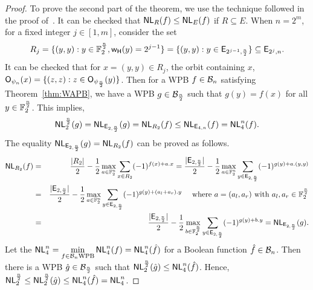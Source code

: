 \documentclass{llncs}
\begin{document}
\begin{proof}
To prove the second part of the theorem, we use the technique followed in the proof of~\cite[Theorem-3.14]{DCC:LiuMes19}.
It can be checked that $\mathsf{NL}_{R}(f) \leq \mathsf{NL}_{E}(f)$ if $R \subseteq E$.
When $n = 2^m$, for a fixed integer $j \in [1,m]$, consider the set  
$$R_j = \{(y,y) : y \in \mathbb{F}_2^{\frac{n}{2}}, \mathsf{w_H}(y)= 2^{j-1} \} = \{(y,y) : y \in \mathsf{E}_{2^{j-1},\frac{n}{2}} \} \subseteq \mathsf{E}_{2^j,n}.$$
It can be checked that for $x = (y,y) \in R_j$, the orbit containing $x$, $\mathsf{O}_{\psi_n}(x) = \{(z,z) : z \in \mathsf{O}_{\psi_\frac{n}{2}}(y)\}$.
Then for a WPB $f \in \mathcal{B}_n$ satisfying Theorem~\ref{thm:WAPB}, we have a WPB $g \in \mathcal{B}_{\frac{n}{2}}$  such that $g(y) = f(x)$ for all $y \in \mathbb{F}_2^{\frac{n}{2}}$. 
This implies, 
\begin{equation}\label{eqn:NL}
\mathsf{NL}_{2}^{\frac{n}{2}}(g) = \mathsf{NL}_{\mathsf{E}_{2,\frac{n}{2}}}(g) = \mathsf{NL}_{R_2}(f) \leq \mathsf{NL}_{\mathsf{E}_{4,n}}(f) = \mathsf{NL}_{4}^{n}(f).
\end{equation}
The equality $\mathsf{NL}_{\mathsf{E}_{2,\frac{n}{2}}}(g) = \mathsf{NL}_{R_2}(f)$ can be proved as follows.
\begin{eqnarray*}
\mathsf{NL}_{R_2}(f) & = & \frac{|R_2|}{2} - \frac{1}{2}\max\limits_{a \in \mathbb{F}_2^n}{\sum\limits_{x\in R_2} (-1)^{f(x)+a.x}} 
= \frac{|\mathsf{E}_{2,\frac{n}{2}}|}{2} - \frac{1}{2}\max\limits_{a \in \mathbb{F}_2^n}{\sum\limits_{y \in \mathsf{E}_{2,\frac{n}{2}}} (-1)^{g(y)+a.(y,y)}} \\
& = & \frac{|\mathsf{E}_{2,\frac{n}{2}}|}{2} - \frac{1}{2}\max\limits_{a \in \mathbb{F}_2^n}{\sum\limits_{y \in \mathsf{E}_{2,\frac{n}{2}}} (-1)^{g(y)+(a_l+a_r).y}} ~~~\text{ where } a = (a_l,a_r)\text{ with } a_l,a_r \in \mathbb{F}_2^{\frac{n}{2}}\\
& = & \frac{|\mathsf{E}_{2,\frac{n}{2}}|}{2} - \frac{1}{2}\max\limits_{b \in \mathbb{F}_2^{\frac{n}{2}}}{\sum\limits_{y \in \mathsf{E}_{2,\frac{n}{2}}} (-1)^{g(y)+b.y}} = \mathsf{NL}_{\mathsf{E}_{2,\frac{n}{2}}}(g).
\end{eqnarray*}
Let the $\mathsf{NL}_{4}^{n} = \min\limits_{f\in \mathcal{B}_n \text{WPB}} \mathsf{NL}_{4}^{n}(f) = \mathsf{NL}_{4}^{n}(\hat{f})$ for a Boolean function $\hat{f} \in \mathcal{B}_n$. Then there is a WPB $\hat{g} \in \mathcal{B}_{\frac{n}{2}}$ such that $\mathsf{NL}_{2}^{\frac{n}{2}}(\hat{g}) \leq \mathsf{NL}_{4}^{n}(\hat{f})$. Hence, $\mathsf{NL}_{2}^{\frac{n}{2}} \leq \mathsf{NL}_{2}^{\frac{n}{2}}(\hat{g}) \leq \mathsf{NL}_{4}^{n}(\hat{f}) = \mathsf{NL}_{4}^{n}$.


\end{proof}
\end{document}
